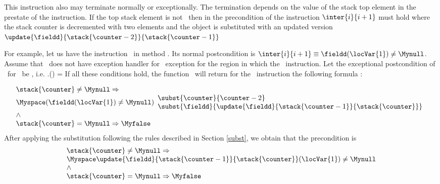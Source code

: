 \begin{itemize}
\begin{enumerate}
			                This instruction  also may terminate normally or exceptionally. The termination depends on the value of the stack 
					top element in the prestate of the instruction. If the top stack element is not \Mynull \ then in the precondition
					of the instruction $\inter{i}{i+1}$ must hold where the stack counter is decremented with two elements and
					the \fieldd object is substituted with an updated version $\update{\fieldd}{ \stack{\counter - 2}}{  \stack{\counter  -1} } $
				
					For example, let us have the instruction \putfield \ \fieldd in method \methodd. Its normal postcondition is
					$ \inter{i}{i+1} \equiv \fieldd( \locVar{1})  \neq \Mynull $. Assume that \methodd \ does not have exception
					handler for \NullPointerExc \ exception for the region in which the \putfield \ instruction. Let the exceptional postcondition
					of \methodd \ for \NullPointerExc \ be \Myfalse, i.e. \methodd.\excPostSpec(\NullPointerExc ) = \Myfalse
					If all these conditions hold, the function \fwpi \ will return for the \putfield \ instruction the following formula : 
					 
					$$\begin{array}{l}
					 \stack{\counter} \ne  \Mynull \Rightarrow \\ 
					  	 \Myspace (\fieldd( \locVar{1})  \neq \Mynull  )
					          \begin{array}{l} 
					                     \subst{ \counter }{  \counter -2 } \\
							     \subst{  \fieldd}{ \update{\fieldd}{ \stack{\counter - 1}}{  \stack{\counter } } }
                                             	  \end{array} \\
                                           \wedge \\
					   \stack{\counter } = \Mynull \Rightarrow \Myfalse
					  \end{array} 
					$$
					After applying the substitution following the rules 
					described in Section \ref{subst}, we obtain that the precondition is 
					$$\begin{array}{l}
					 \stack{\counter} \ne  \Mynull \Rightarrow \\  
                                                \Myspace  \update{\fieldd}{ \stack{\counter - 1} }{\stack{\counter} }( \locVar{1})  \neq \Mynull \\
                                          \wedge \\
					  \stack{\counter } = \Mynull \Rightarrow \Myfalse
					\end{array} 
					$$
					

\end{enumerate}
\end{itemize}
